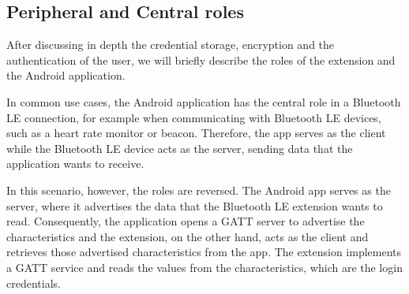\subsection{Peripheral and Central roles}
After discussing in depth the credential storage, encryption and the authentication of the user, we will briefly describe the roles of the extension and the Android application.

In common use cases, the Android application has the central role in a Bluetooth LE connection, for example when communicating with Bluetooth LE devices, such as a heart rate monitor or beacon. Therefore, the app serves as the client while the Bluetooth LE device acts as the server, sending data that the application wants to receive.

In this scenario, however, the roles are reversed. The Android app serves as the server, where it advertises the data that the Bluetooth LE extension wants to read. Consequently, the application opens a GATT server to advertise the characteristics and the extension, on the other hand, acts as the client and retrieves those advertised characteristics from the app. The extension implements a GATT service and reads the values from the characteristics, which are the login credentials.

